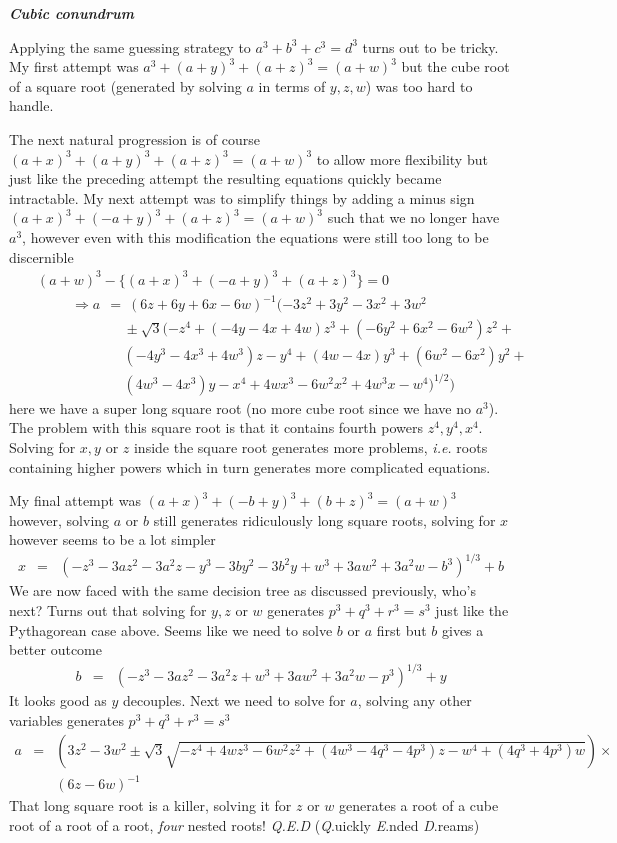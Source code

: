 \documentclass[aps,preprint,preprintnumbers,nofootinbib,showpacs,prd]{revtex4-1}
\newcommand{\ie}{{\it i.e.} }
\newcommand{\nbea}{\begin{eqnarray*}}
\newcommand{\neea}{\end{eqnarray*}}
\begin{document}
\bigskip\textbf{\textit{Cubic conundrum}}

Applying the same guessing strategy to $a^3 + b^3 + c^3 = d^3$ turns out to be tricky. My first attempt was $a^3 + (a+y)^3 + (a+z)^3 = (a+w)^3$ but the cube root of a square root (generated by solving $a$ in terms of $y,z,w$) was too hard to handle.

The next natural progression is of course $(a+x)^3 + (a+y)^3 + (a+z)^3 = (a+w)^3$ to allow more flexibility but just like the preceding attempt the resulting equations quickly became intractable. My next attempt was to simplify things by adding a minus sign $(a+x)^3 + (-a+y)^3 + (a+z)^3 = (a+w)^3$ such that we no longer have $a^3$, however even with this modification the equations were still too long to be discernible
%
\nbea
&& (a+w)^3 - \{(a+x)^3 + (-a+y)^3 + (a+z)^3 \} = 0\\
&& ~~~~~~~~~~~\Longrightarrow a ~~= ~ (6z+6y+6x-6w)^{-1} (-3z^2+3y^2-3x^2+3w^2 \\
&& ~~~~~~~~~~~~~~~~~~~~~~~~~~~~ \pm \sqrt{3} (-z^4+(-4y-4x+4w)z^3+(-6y^2+6x^2-6w^2)z^2+ \\
&& ~~~~~~~~~~~~~~~~~~~~~~~~~~~~ (-4y^3-4x^3+4w^3)z-y^4 + (4w-4x)y^3+(6w^2-6x^2)y^2+ \\
&& ~~~~~~~~~~~~~~~~~~~~~~~~~~~~ (4w^3-4x^3)y-x^4+4wx^3-6w^2x^2+4w^3x-w^4 )^{1/2})
\neea
%
here we have a super long square root (no more cube root since we have no $a^3$). The problem with this square root is that it contains fourth powers $z^4, y^4, x^4$. Solving for $x, y$ or $z$ inside the square root generates more problems, \ie roots containing higher powers which in turn generates more complicated equations.

My final attempt was $(a+x)^3 + (-b+y)^3 + (b+z)^3 = (a+w)^3$ however, solving $a$ or $b$ still generates ridiculously long square roots, solving for $x$ however seems to be a lot simpler
%
\nbea
x & = & (-z^3-3az^2-3a^2z-y^3-3by^2-3b^2y+w^3+3aw^2+3a^2w-b^3)^{1/3}+b
\neea
%
We are now faced with the same decision tree as discussed previously, who's next? Turns out that solving for $y,z$ or $w$ generates $p^3+q^3+r^3 = s^3$ just like the Pythagorean case above. Seems like we need to solve $b$ or $a$ first but $b$ gives a better outcome
%
\nbea
b & = & (-z^3-3az^2-3a^2z+w^3+3aw^2+3a^2w-p^3)^{1/3}+y
\neea	
%
It looks good as $y$ decouples. Next we need to solve for $a$, solving any other variables generates $p^3+q^3+r^3 = s^3$
%
\nbea
a & = & \left (3z^2-3w^2 \pm \sqrt{3}\sqrt{-z^4+4wz^3-6w^2z^2+(4w^3-4q^3-4p^3)z-w^4+(4q^3+4p^3)w} \right ) \times \\
&& (6z-6w)^{-1}
\neea	
%
That long square root is a killer, solving it for $z$ or $w$ generates a root of a cube root of a root of a root, {\it four} nested roots! {\it Q.E.D} ({\it Q}.uickly {\it E}.nded {\it D}.reams)
\end{document}
